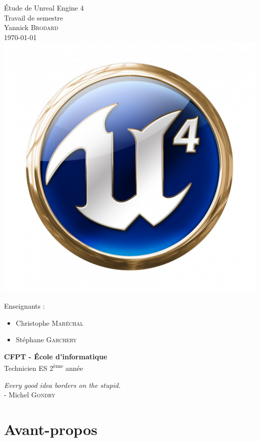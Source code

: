 \documentclass[11pt, a4paper, oneside]{article}
\begin{document}
\begin{center}
{\Huge{Étude de Unreal Engine 4}} \\[0.5cm]
{\LARGE{Travail de semestre}}\\[0.5cm]
{\Large{Yannick \textsc{Brodard}}}\\[0.3cm]
\today\\
\includegraphics[scale=0.4]{UE4_logo}
\end{center}
Enseignants :
\begin{itemize}
\item Christophe \textsc{Maréchal}
\item Stéphane \textsc{Garchery}\\[3cm]
\end{itemize}
\textbf{CFPT - École d'informatique}\\
Technicien ES 2\textsuperscript{ème} année
\thispagestyle{empty}
\newpage
\vspace*{\fill}
\begin{flushright}
\textit{Every good idea borders on the stupid.}\\[0.3cm]
- Michel \textsc{Gondry}
\end{flushright}
\vspace*{\fill}
\thispagestyle{empty}
\newpage
\part{Avant-propos}
\end{document}
